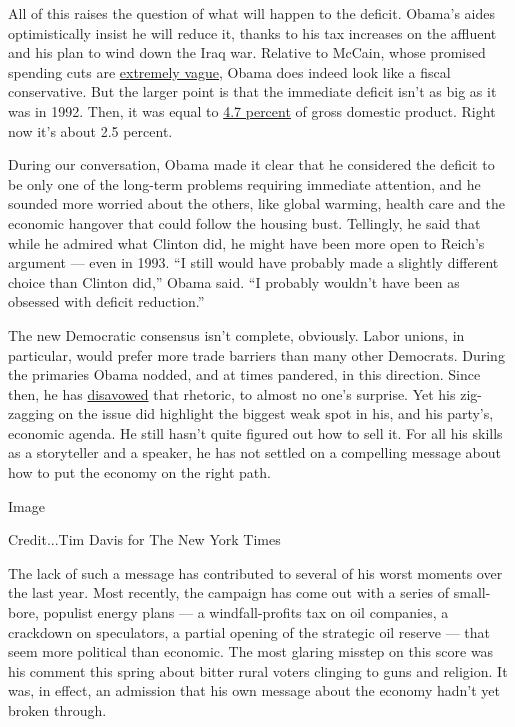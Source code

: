 All of this raises the question of what will happen to the deficit.
Obama's aides optimistically insist he will reduce it, thanks to his tax
increases on the affluent and his plan to wind down the Iraq war.
Relative to McCain, whose promised spending cuts are
\href{http://www.nytimes3xbfgragh.onion/2008/04/23/business/23leonhardt.html}{extremely
vague}, Obama does indeed look like a fiscal conservative. But the
larger point is that the immediate deficit isn't as big as it was in
1992. Then, it was equal to
\href{http://www.cbo.gov/budget/data/historical.pdf}{4.7 percent} of
gross domestic product. Right now it's about 2.5 percent.

During our conversation, Obama made it clear that he considered the
deficit to be only one of the long-term problems requiring immediate
attention, and he sounded more worried about the others, like global
warming, health care and the economic hangover that could follow the
housing bust. Tellingly, he said that while he admired what Clinton did,
he might have been more open to Reich's argument --- even in 1993. ``I
still would have probably made a slightly different choice than Clinton
did,'' Obama said. ``I probably wouldn't have been as obsessed with
deficit reduction.''

The new Democratic consensus isn't complete, obviously. Labor unions, in
particular, would prefer more trade barriers than many other Democrats.
During the primaries Obama nodded, and at times pandered, in this
direction. Since then, he has
\href{http://money.cnn.com/2008/06/18/magazines/fortune/easton_obama.fortune/index.htm?postversion=2008061815}{disavowed}
that rhetoric, to almost no one's surprise. Yet his zig-zagging on the
issue did highlight the biggest weak spot in his, and his party's,
economic agenda. He still hasn't quite figured out how to sell it. For
all his skills as a storyteller and a speaker, he has not settled on a
compelling message about how to put the economy on the right path.

Image

Credit...Tim Davis for The New York Times

The lack of such a message has contributed to several of his worst
moments over the last year. Most recently, the campaign has come out
with a series of small-bore, populist energy plans --- a
windfall-profits tax on oil companies, a crackdown on speculators, a
partial opening of the strategic oil reserve --- that seem more
political than economic. The most glaring misstep on this score was his
comment this spring about bitter rural voters clinging to guns and
religion. It was, in effect, an admission that his own message about the
economy hadn't yet broken through.

